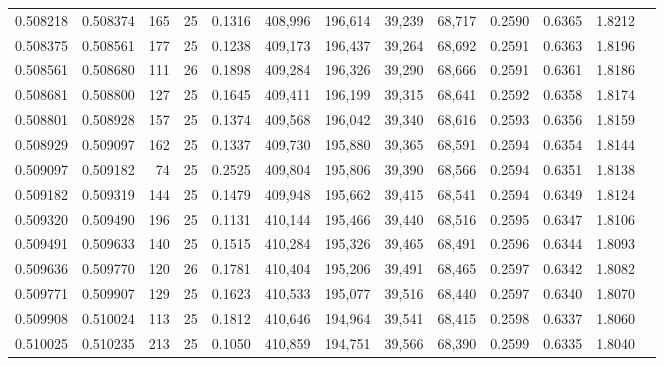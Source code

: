 \begin{tabular}{rrrrrrrrrrrrr}
0.508218 & 0.508374 &   165 &  25 &                                     0.1316 & 408,996 & 196,614 &  39,239 &  68,717 & 0.2590 & 0.6365 & 1.8212 \\
0.508375 & 0.508561 &   177 &  25 &                                     0.1238 & 409,173 & 196,437 &  39,264 &  68,692 & 0.2591 & 0.6363 & 1.8196 \\
0.508561 & 0.508680 &   111 &  26 &                                     0.1898 & 409,284 & 196,326 &  39,290 &  68,666 & 0.2591 & 0.6361 & 1.8186 \\
0.508681 & 0.508800 &   127 &  25 &                                     0.1645 & 409,411 & 196,199 &  39,315 &  68,641 & 0.2592 & 0.6358 & 1.8174 \\
0.508801 & 0.508928 &   157 &  25 &                                     0.1374 & 409,568 & 196,042 &  39,340 &  68,616 & 0.2593 & 0.6356 & 1.8159 \\
0.508929 & 0.509097 &   162 &  25 &                                     0.1337 & 409,730 & 195,880 &  39,365 &  68,591 & 0.2594 & 0.6354 & 1.8144 \\
0.509097 & 0.509182 &    74 &  25 &                                     0.2525 & 409,804 & 195,806 &  39,390 &  68,566 & 0.2594 & 0.6351 & 1.8138 \\
0.509182 & 0.509319 &   144 &  25 &                                     0.1479 & 409,948 & 195,662 &  39,415 &  68,541 & 0.2594 & 0.6349 & 1.8124 \\
0.509320 & 0.509490 &   196 &  25 &                                     0.1131 & 410,144 & 195,466 &  39,440 &  68,516 & 0.2595 & 0.6347 & 1.8106 \\
0.509491 & 0.509633 &   140 &  25 &                                     0.1515 & 410,284 & 195,326 &  39,465 &  68,491 & 0.2596 & 0.6344 & 1.8093 \\
0.509636 & 0.509770 &   120 &  26 &                                     0.1781 & 410,404 & 195,206 &  39,491 &  68,465 & 0.2597 & 0.6342 & 1.8082 \\
0.509771 & 0.509907 &   129 &  25 &                                     0.1623 & 410,533 & 195,077 &  39,516 &  68,440 & 0.2597 & 0.6340 & 1.8070 \\
0.509908 & 0.510024 &   113 &  25 &                                     0.1812 & 410,646 & 194,964 &  39,541 &  68,415 & 0.2598 & 0.6337 & 1.8060 \\
0.510025 & 0.510235 &   213 &  25 &                                     0.1050 & 410,859 & 194,751 &  39,566 &  68,390 & 0.2599 & 0.6335 & 1.8040 \\

\end{tabular}
